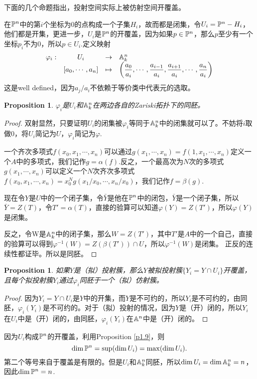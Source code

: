 \documentclass[9pt]{extarticle}
\theoremstyle{plain}%
\newtheorem{pro}[defi]{Proposition}%
\begin{document}
下面的几个命题指出，投射空间实际上被仿射空间开覆盖。

在$\mathbb{P}^n$中的第$i$个坐标为$0$的点构成一个子集$H_i$，故而都是闭集，令$U_i=\mathbb{P}^n-H_i$，他们都是开集，更进一步，$U_i$是$\mathbb{P}^n$的开覆盖，因为如果$p\in \mathbb{P}^n$，那么$p$至少有一个坐标$p_i$不为$0$，所以$p\in U_i$.定义映射
\[
	\begin{array}{lccl}
		\varphi_i:&U_i&\to& \mathbb{A}^n_k\\
		&[a_0,\cdots ,a_n]&\mapsto&\displaystyle{\left(\frac{a_0}{a_i},\cdots ,\frac{a_{i-1}}{a_i},\frac{a_{i+1}}{a_i},\cdots,\frac{a_n}{a_i}\right)}
	\end{array}
\]
这是well defined，因为$a_j/a_i$不依赖于等价类中代表元的选取。

\begin{pro}
$\varphi_i$是$U_i$和$\mathbb{A}^n_k$在两边各自的Zariski拓扑下的同胚。
\end{pro}
\begin{proof}
双射显然，只要证明$U_i$的闭集被$\varphi_i$等同于$\mathbb{A}^n_k$中的闭集就可以了。不妨将$i$取做$0$，将$U_i$简记为$U$，$\varphi_i$简记为$\varphi$.

一个齐次多项式$f(x_0,x_1,\cdots ,x_n)$可以通过$g(x_1,\cdots ,x_n)=f(1,x_1,\cdots ,x_n)$定义一个$A$中的多项式，我们记作$g=\alpha(f)$.反之，一个最高次为$N$次的多项式$g(x_1,\cdots ,x_n)$可以定义一个$N$次齐次多项式$f(x_0,x_1,\cdots ,x_n)=x_0^Ng(x_1/x_0,\cdots ,x_n/x_0)$，我们记作$f=\beta(g)$.

现在令$Y$是$U$中的一个闭子集，令$\bar{Y}$是他在$\mathbb{P}^n$中的闭包，$\bar{Y}$是一个闭子集，所以$\bar{Y}=Z(T)$，令$T'=\alpha(T)$，直接的验算可以知道$\varphi(Y)=Z(T')$，所以$\varphi(Y)$是闭集。

反之，令W是$\mathbb{A}^n_k$中的闭子集，那么$W=Z(T')$，其中$T'$是$A$中的一个自己，直接的验算可以得到$\varphi^{-1}(W)=Z(\beta(T'))\cap U$，所以$\varphi^{-1}(W)$是闭集。
正反的连续性都证毕。所以是同胚。
\end{proof}
\begin{pro}
	如果$Y$是（拟）投射簇，那么$Y$被拟投射簇$\{Y_i=Y\cap U_i\}$开覆盖，且每个拟投射簇$Y_i$通过$\varphi_i$同胚于一个（拟）仿射簇。
	\label{c2:p8}
\end{pro}
\begin{proof}
因为$Y_i=Y\cap U_i$是$Y$中的开集，而$Y$是不可约的，所以$Y_i$是不可约的，由同胚，$\varphi_i(Y_i)$是不可约的。对于（拟）投射的情况，因为$Y$是（开）闭的，所以$Y_i$在$U_i$中是（开）闭的，由同胚，$\varphi_i(Y_i)$在$\mathbb{A}^n$中是（开）闭的。
\end{proof}

因为$U_i$构成$\mathbb{P}^n$的开覆盖，利用Proposition \ref{p1.9}，则
\[
	\dim  \mathbb{P}^n=\sup(\dim U_i)=\max(\dim U_i).
\]
第二个等号来自于覆盖是有限的。但是$U_i$和$\mathbb{A}^n_k$同胚，所以$\dim U_i=\dim \mathbb{A}^n_k=n$，因此$\dim  \mathbb{P}^n=n$.
\end{document}
